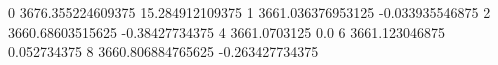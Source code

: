 0 3676.355224609375 15.284912109375
1 3661.036376953125 -0.033935546875
2 3660.68603515625 -0.38427734375
4 3661.0703125 0.0
6 3661.123046875 0.052734375
8 3660.806884765625 -0.263427734375
